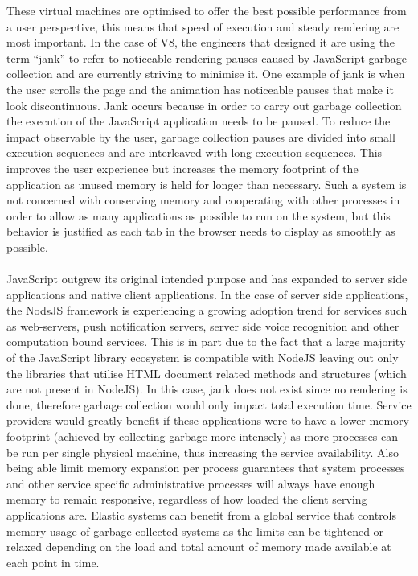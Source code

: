 \documentclass{l4proj}
\begin{document}
\hspace*{3em} These virtual machines are optimised to offer the best possible performance from a user perspective, this means that speed of execution and steady rendering are most important. In the case of V8, the engineers that designed it are using the term ``jank'' to refer to noticeable rendering pauses caused by JavaScript garbage collection and are currently striving to minimise it. One example of jank is when the user scrolls the page and the animation has noticeable pauses that make it look discontinuous. Jank occurs because in order to carry out garbage collection the execution of the JavaScript application needs to be paused. To reduce the impact observable by the user, garbage collection pauses are divided into small execution sequences and are interleaved with long execution sequences. This improves the user experience but increases the memory footprint of the application as unused memory is held for longer than necessary. Such a system is not concerned with conserving memory and cooperating with other processes in order to allow as many applications as possible to run on the system, but this behavior is justified as each tab in the browser needs to display as smoothly as possible.
\\\\%
\hspace*{3em} JavaScript outgrew its original intended purpose and has expanded to server side applications and native client applications. In the case of server side applications, the NodsJS framework is experiencing a growing adoption trend for services such as web-servers, push notification servers, server side voice recognition and other computation bound services. This is in part due to the fact that a large majority of the JavaScript library ecosystem is compatible with NodeJS leaving out only the libraries that utilise HTML document related methods and structures (which are not present in NodeJS). In this case, jank does not exist since no rendering is done, therefore garbage collection would only impact total execution time. Service providers would greatly benefit if these applications were to have a lower memory footprint (achieved by collecting garbage more intensely) as more processes can be run per single physical machine, thus increasing the service availability. Also being able limit memory expansion per process guarantees that system processes and other service specific administrative processes will always have enough memory to remain responsive, regardless of how loaded the client serving applications are. Elastic systems can benefit from a global service that controls memory usage of garbage collected systems as the limits can be tightened or relaxed depending on the load and total amount of memory made available at each point in time.\\%
\end{document}
